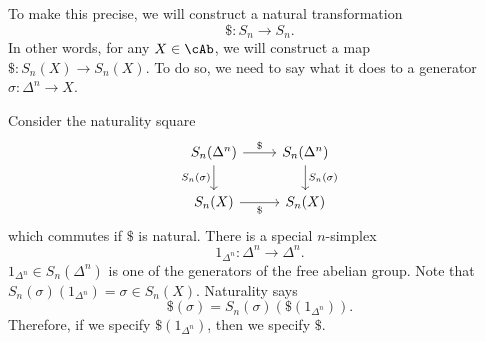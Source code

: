 \documentclass{standalone}
\begin{document}
To make this precise, we will construct a natural transformation
\[
  \$ \colon S_n \to S_n.
\]
In other words, for any \(X \in \cAb\), we will construct a map
\(\$ \colon S_n(X) \to S_n(X)\). To do so, we need to say what it does
to a generator \(\sigma \colon \Delta^n \to X\).

Consider the naturality square
\[
  \begin{tikzcd}
    S_n(\Delta^n) \arrow[r, "\$"] \arrow[d, "S_n(\sigma)"'] &
      S_n(\Delta^n) \arrow[d, "S_n(\sigma)"] \\
    S_n(X) \arrow[r, "\$"'] &
      S_n(X)
  \end{tikzcd}
\]
which commutes if \(\$\) is natural. There is a special \(n\)-simplex
\[
  1_{\Delta^n} \colon \Delta^n \to \Delta^n.
\]
\(1_{\Delta^n} \in S_n(\Delta^n)\) is one of the generators of the
free abelian group.
Note that \(S_n(\sigma)(1_{\Delta^n}) = \sigma \in S_n(X)\).
Naturality says
\[
  \$(\sigma) = S_n(\sigma)(\$(1_{\Delta^n})).
\]
Therefore, if we specify \(\$(1_{\Delta^n})\), then we specify \(\$\).
\end{document}
